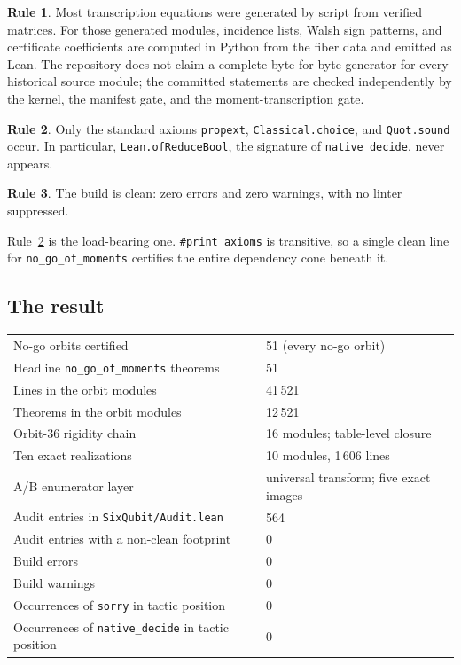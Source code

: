 \documentclass[11pt,a4paper]{article}
\newcommand{\lean}[1]{\texttt{#1}}
\theoremstyle{definition}
\newtheorem{standard}{Rule}
\begin{document}
\begin{standard}
Most transcription equations were generated by script from verified matrices.
For those generated modules, incidence lists, Walsh sign patterns, and certificate
coefficients are computed in Python from the fiber data and emitted as Lean. The
repository does not claim a complete byte-for-byte generator for every historical
source module; the committed statements are checked independently by the kernel,
the manifest gate, and the moment-transcription gate.
\end{standard}

\begin{standard}
\label{rule:axioms}
Only the standard axioms \lean{propext}, \lean{Classical.choice}, and
\lean{Quot.sound} occur. In particular,
\lean{Lean.ofReduceBool}, the signature of \lean{native\_decide}, never appears.
\end{standard}

\begin{standard}
The build is clean: zero errors and zero warnings, with no linter suppressed.
\end{standard}

Rule~\ref{rule:axioms} is the load-bearing one. \lean{\#print axioms} is
transitive, so a single clean line for \lean{no\_go\_of\_moments} certifies the
entire dependency cone beneath it.

\subsection{The result}

\begin{center}
\begin{tabular}{ll}
\toprule
No-go orbits certified & 51 (every no-go orbit) \\
Headline \lean{no\_go\_of\_moments} theorems & 51 \\
Lines in the orbit modules & 41\,521 \\
Theorems in the orbit modules & 12\,521 \\
Orbit-36 rigidity chain & 16 modules; table-level closure \\
Ten exact realizations & 10 modules, 1\,606 lines \\
A/B enumerator layer & universal transform; five exact images \\
Audit entries in \lean{SixQubit/Audit.lean} & 564 \\
Audit entries with a non-clean footprint & 0 \\
Build errors & 0 \\
Build warnings & 0 \\
Occurrences of \lean{sorry} in tactic position & 0 \\
Occurrences of \lean{native\_decide} in tactic position & 0 \\
\bottomrule
\end{tabular}
\end{center}
\end{document}

